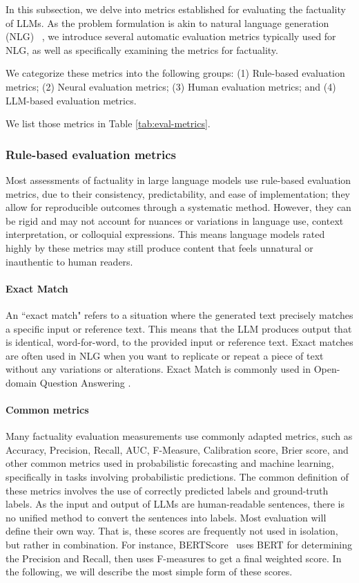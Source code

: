 

In this subsection, we delve into metrics established for evaluating the factuality of LLMs. As the problem formulation is akin to natural language generation (NLG)
~\citep{celikyilmaz2021evaluation,ji2023survey}, we introduce several automatic evaluation metrics typically used for NLG, as well as specifically examining the metrics for factuality.

We categorize these metrics into the following groups:
(1) Rule-based evaluation metrics;
(2) Neural evaluation metrics;
(3) Human evaluation metrics; and
(4) LLM-based evaluation metrics.

We list those metrics in Table \ref{tab:eval-metrics}.
\subsubsection{Rule-based evaluation metrics}

Most assessments of factuality in large language models use rule-based evaluation metrics, due to their consistency, predictability, and ease of implementation; they allow for reproducible outcomes through a systematic method. However, they can be rigid and may not account for nuances or variations in language use, context interpretation, or colloquial expressions. This means language models rated highly by these metrics may still produce content that feels unnatural or inauthentic to human readers.


\paragraph{Exact Match} An ``exact match" refers to a situation where the generated text precisely matches a specific input or reference text. This means that the LLM produces output that is identical, word-for-word, to the provided input or reference text. Exact matches are often used in NLG when you want to replicate or repeat a piece of text without any variations or alterations. Exact Match is commonly used in Open-domain Question Answering \citep{Fusion-in-Decoder,rfid}.

\paragraph{Common metrics}
Many factuality evaluation measurements use commonly adapted metrics, such as Accuracy, Precision, Recall, AUC, F-Measure, Calibration score,  Brier score, and other common metrics used in probabilistic forecasting and machine learning, specifically in tasks involving probabilistic predictions. The common definition of these metrics involves the use of correctly predicted labels and ground-truth labels. As the input and output of LLMs are human-readable sentences, there is no unified method to convert the sentences into labels. Most evaluation will define their own way. That is, these scores are frequently not used in isolation, but rather in combination. For instance, BERTScore~\citep{BERTscore} uses BERT for determining the Precision and Recall, then uses F-measures to get a final weighted score. In the following, we will describe the most simple form of these scores.


